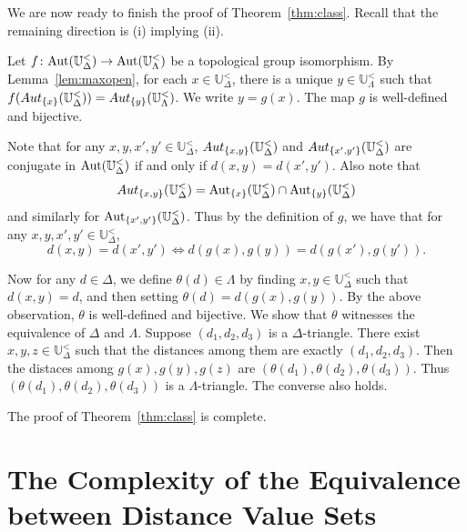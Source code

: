 \documentclass{amsart}
\theoremstyle{definition}
\theoremstyle{remark}
\begin{document}
     We are now ready to finish the proof of Theorem~\ref{thm:class}. Recall that the remaining direction is (i) implying (ii).

        Let $f\colon \mbox{\rm Aut}(\mathbb{U}^<_\Delta)\to\mbox{\rm Aut}(\mathbb{U}^<_\Lambda)$ be a topological group isomorphism. By Lemma~\ref{lem:maxopen}, for each $x \in \mathbb{U}_{\Delta}^<$, there is a unique $y \in \mathbb{U}_{\Lambda}^<$ such that $f({\rm Aut}_{\{x\}}(\mathbb{U}_{\Delta}^<))={\rm Aut}_{\{y\}}(\mathbb{U}_{\Lambda}^<)$. We write $y=g(x)$. The map $g$ is well-defined and bijective. 

        Note that for any $x,y,x',y'\in\mathbb{U}_{\Delta}^<$, ${\rm Aut}_{\{x,y\}}(\mathbb{U}_{\Delta}^<)$ and ${\rm Aut}_{\{x',y'\}}(\mathbb{U}_{\Delta}^<)$ are conjugate in $\mbox{\rm Aut}(\mathbb{U}^<_\Delta)$ if and only if $d(x,y)=d(x',y')$. Also note that
$$ {\rm Aut}_{\{x,y\}}(\mathbb{U}_{\Delta}^<)=\mbox{\rm Aut}_{\{x\}}(\mathbb{U}^<_\Delta)\cap \mbox{\rm Aut}_{\{y\}}(\mathbb{U}^<_\Delta) $$
and similarly for $\mbox{\rm Aut}_{\{x',y'\}}(\mathbb{U}^<_\Delta)$. Thus by the definition of $g$, we have that for any $x,y,x',y' \in \mathbb{U}_{\Delta}^<$,
$$ d(x,y)=d(x',y') \iff d(g(x),g(y)) = d(g(x'),g(y')).$$
        
Now for any $d \in \Delta$, we define $\theta(d) \in \Lambda$ by finding $x,y \in \mathbb{U}_{\Delta}^<$ such that $d(x,y)=d$, and then setting $\theta(d)=d(g(x),g(y))$. By the above observation, $\theta$ is well-defined and bijective. We show that $\theta$ witnesses the equivalence of $\Delta $ and $ \Lambda$. Suppose $(d_1,d_2,d_3)$ is a $\Delta$-triangle. There exist $x,y,z \in \mathbb{U}_{\Delta}^<$ such that the distances among them are exactly $(d_1,d_2,d_3)$. Then the distaces among $g(x),g(y),g(z)$ are $(\theta(d_1),\theta(d_2),\theta(d_3))$. Thus $(\theta(d_1),\theta(d_2),\theta(d_3))$ is a $\Lambda$-triangle. The converse also holds.

The proof of Theorem~\ref{thm:class} is complete.
    

     
     






















\section{The Complexity of the Equivalence between Distance Value Sets\label{sec:CDVS}}
\end{document}
